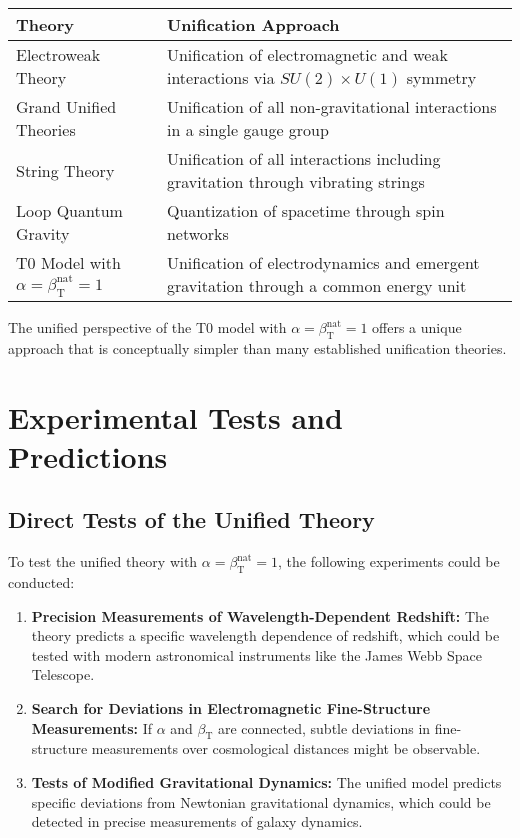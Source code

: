 \documentclass[12pt,a4paper]{article}
\newcommand{\betaT}{\beta_{\text{T}}}
\begin{document}
	\begin{tcolorbox}[colback=blue!5!white,colframe=blue!75!black,title=Comparison with Other Unification Theories]
		\begin{tabular}{>{\raggedright\arraybackslash}p{3cm}|>{\raggedright\arraybackslash}p{8cm}}
			\textbf{Theory} & \textbf{Unification Approach} \\
			\hline
			Electroweak Theory & Unification of electromagnetic and weak interactions via \(SU(2) \times U(1)\) symmetry \\
			\hline
			Grand Unified Theories & Unification of all non-gravitational interactions in a single gauge group \\
			\hline
			String Theory & Unification of all interactions including gravitation through vibrating strings \\
			\hline
			Loop Quantum Gravity & Quantization of spacetime through spin networks \\
			\hline
			T0 Model with \(\alpha = \betaT^{\text{nat}} = 1\) & Unification of electrodynamics and emergent gravitation through a common energy unit \\
		\end{tabular}
	\end{tcolorbox}
	
	The unified perspective of the T0 model with \(\alpha = \betaT^{\text{nat}} = 1\) offers a unique approach that is conceptually simpler than many established unification theories.
	
	\section{Experimental Tests and Predictions}
	
	\subsection{Direct Tests of the Unified Theory}
	
	To test the unified theory with \(\alpha = \betaT^{\text{nat}} = 1\), the following experiments could be conducted:
	
	\begin{enumerate}
		\item \textbf{Precision Measurements of Wavelength-Dependent Redshift:} The theory predicts a specific wavelength dependence of redshift, which could be tested with modern astronomical instruments like the James Webb Space Telescope.
		
		\item \textbf{Search for Deviations in Electromagnetic Fine-Structure Measurements:} If \(\alpha\) and \(\betaT\) are connected, subtle deviations in fine-structure measurements over cosmological distances might be observable.
		
		\item \textbf{Tests of Modified Gravitational Dynamics:} The unified model predicts specific deviations from Newtonian gravitational dynamics, which could be detected in precise measurements of galaxy dynamics.
	\end{enumerate}
	
\end{document}
